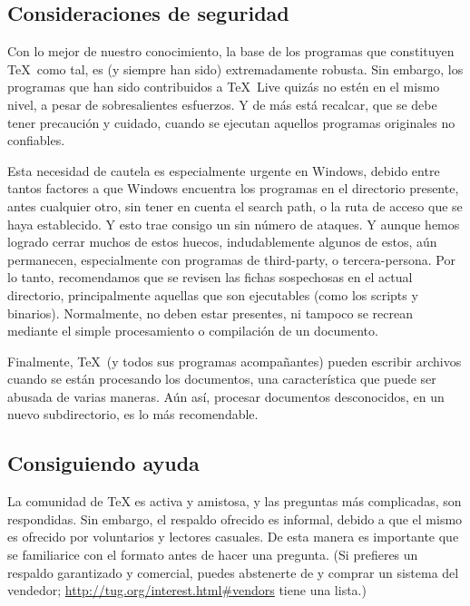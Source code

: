\documentclass{article}
\begin{document}
\subsection{Consideraciones de seguridad}
\label{sec:security}

Con lo mejor de nuestro conocimiento, la base de los programas
que constituyen  \TeX\ como tal, es (y siempre han sido)
extremadamente robusta. Sin embargo, los programas que han sido
contribuidos a \TeX\ Live quizás no estén en el mismo nivel, a
pesar de sobresalientes esfuerzos. Y de más está recalcar, que
se debe tener precaución y cuidado, cuando se ejecutan
aquellos programas originales no confiables. 

Esta necesidad de cautela es especialmente urgente en Windows, debido
entre tantos factores a que Windows encuentra los programas en el
directorio presente, antes cualquier otro, sin tener en cuenta el
search path, o la ruta de acceso que se haya establecido. Y esto trae
consigo un sin número de ataques. Y aunque hemos logrado cerrar muchos
de estos huecos, indudablemente algunos de estos, aún permanecen,
especialmente con programas de third-party, o tercera-persona. Por lo
tanto, recomendamos que se revisen las fichas sospechosas en el actual
directorio, principalmente aquellas que son ejecutables (como los
scripts y binarios). Normalmente, no deben estar presentes, ni tampoco
se recrean mediante el simple procesamiento o compilación de un
documento. 
  
Finalmente, \TeX\ (y todos sus programas acompañantes) pueden escribir
archivos cuando se están procesando los documentos, una característica
que puede ser abusada de varias maneras. Aún así, procesar documentos
desconocidos, en un nuevo subdirectorio, es lo más recomendable. 

\subsection{Consiguiendo ayuda}
\label{sec:help}

La comunidad de \TeX{} es activa y amistosa, y las preguntas más
complicadas, son respondidas. Sin embargo, el respaldo ofrecido es
informal, debido a que el mismo es ofrecido por voluntarios y lectores
casuales. De esta manera es importante que se familiarice con el
formato antes de hacer una pregunta. (Si prefieres un respaldo
garantizado y comercial, puedes abstenerte de \TL{} y comprar un
sistema del vendedor; \url{http://tug.org/interest.html#vendors} tiene
una lista.)
\end{document}
